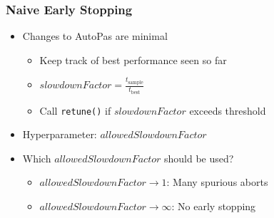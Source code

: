 \documentclass[
	10pt,
	t		%
]{beamer}
\begin{document}
\begin{frame}
    \frametitle{Naive Early Stopping}

    \begin{itemize}
        \item Changes to AutoPas are minimal
              \begin{itemize}
                  \item Keep track of best performance seen so far
                  \item $slowdownFactor = \frac{t_{\text{sample}}}{t_{\text{best}}}$
                  \item Call \texttt{retune()} if $slowdownFactor$ exceeds threshold
              \end{itemize}


        \item Hyperparameter: $allowedSlowdownFactor$

        \item Which $allowedSlowdownFactor$ should be used?
              \begin{itemize}
                  \item $allowedSlowdownFactor \rightarrow 1$: Many spurious aborts
                  \item $allowedSlowdownFactor \rightarrow \infty$: No early stopping
              \end{itemize}
    \end{itemize}
\end{frame}
\end{document}
